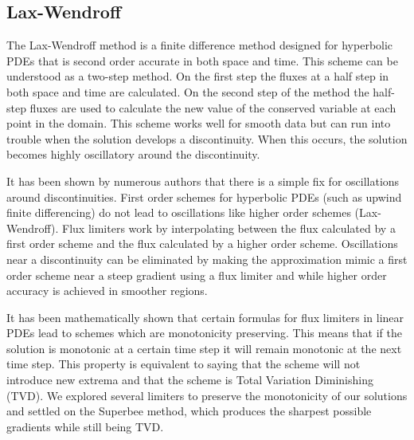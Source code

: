 \subsection{Lax-Wendroff}
\label{Lax}

The Lax-Wendroff method is a finite difference method designed for hyperbolic PDEs that is second order accurate in both space and time. This scheme can be understood as a two-step method. On the first step the fluxes at a half step in both space and time are calculated. On the second step of the method the half-step fluxes are used to calculate the new value of the conserved variable at each point in the domain. This scheme works well for smooth data but can run into trouble when the solution develops a discontinuity. When this occurs, the solution becomes highly oscillatory around the discontinuity.

It has been shown by numerous authors \cite{Rider,Leveque} that there is a simple fix for oscillations around discontinuities. First order schemes for hyperbolic PDEs (such as upwind finite differencing) do not lead to oscillations like higher order schemes (Lax-Wendroff). Flux limiters work by interpolating between the flux calculated by a first order scheme and the flux calculated by a higher order scheme. Oscillations near a discontinuity can be eliminated by making the approximation mimic a first order scheme near a steep gradient using a flux limiter and while higher order accuracy is achieved in smoother regions. 

It has been mathematically shown that certain formulas for flux limiters in linear PDEs lead to schemes which are monotonicity preserving. This means that if the solution is monotonic at a certain time step it will remain monotonic at the next time step. This property is equivalent to saying that the scheme will not introduce new extrema and that the scheme is Total Variation Diminishing (TVD). We explored several limiters to preserve the monotonicity of our solutions and settled on the Superbee method, which produces the sharpest possible gradients while still being TVD.